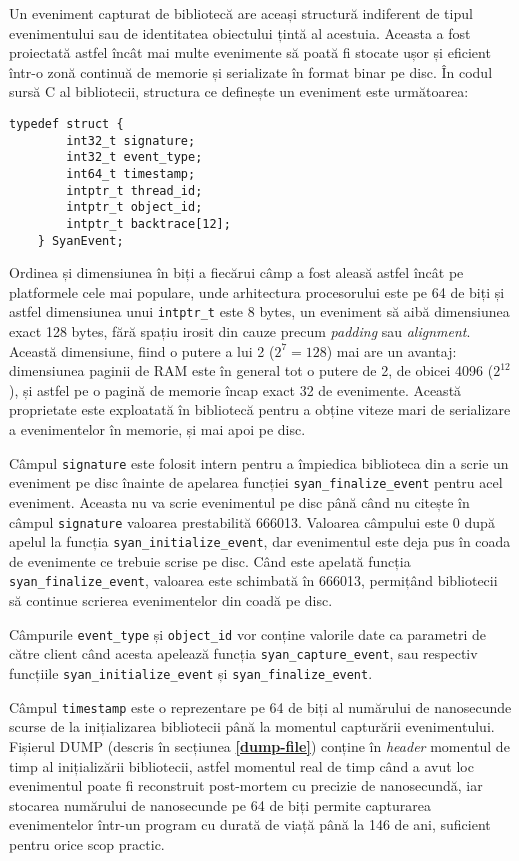 Un eveniment capturat de bibliotecă are aceași structură indiferent de
tipul evenimentului sau de identitatea obiectului țintă al acestuia.
Aceasta a fost proiectată astfel încât mai multe evenimente să poată fi
stocate ușor și eficient într-o zonă continuă de memorie și serializate
în format binar pe disc. În codul sursă C al bibliotecii, structura ce
definește un eveniment este următoarea:
\begin{lstlisting}[caption=Structura unui eveniment capturat]
    typedef struct {
        int32_t signature;
        int32_t event_type;
        int64_t timestamp;
        intptr_t thread_id;
        intptr_t object_id;
        intptr_t backtrace[12];
    } SyanEvent;
\end{lstlisting}

Ordinea și dimensiunea în biți a fiecărui câmp a fost aleasă astfel
încât pe platformele cele mai populare, unde arhitectura procesorului
este pe 64 de biți și astfel dimensiunea unui \lstinline{intptr_t} este
8 bytes, un eveniment să aibă dimensiunea exact 128 bytes, fără spațiu
irosit din cauze precum \textit{padding} sau \textit{alignment}. Această
dimensiune, fiind o putere a lui 2 ($2^7=128$) mai are un avantaj:
dimensiunea paginii de RAM este în general tot o putere de 2, de obicei
4096 ($2^{12}$), și astfel pe o pagină de memorie încap exact 32 de
evenimente. Această proprietate este exploatată în bibliotecă pentru a
obține viteze mari de serializare a evenimentelor în memorie, și mai
apoi pe disc.

Câmpul \lstinline{signature} este folosit intern pentru a împiedica
biblioteca din a scrie un eveniment pe disc înainte de apelarea funcției
\lstinline{syan_finalize_event} pentru acel eveniment. Aceasta nu va
scrie evenimentul pe disc până când nu citește în câmpul
\lstinline{signature} valoarea prestabilită 666013. Valoarea câmpului
este 0 după apelul la funcția \lstinline{syan_initialize_event}, dar
evenimentul este deja pus în coada de evenimente ce trebuie scrise pe
disc. Când este apelată funcția \lstinline{syan_finalize_event},
valoarea este schimbată în 666013, permițând bibliotecii să continue
scrierea evenimentelor din coadă pe disc.

Câmpurile \lstinline{event_type} și \lstinline{object_id} vor conține
valorile date ca parametri de către client când acesta apelează funcția
\lstinline{syan_capture_event}, sau respectiv funcțiile
\lstinline{syan_initialize_event} și \lstinline{syan_finalize_event}.

Câmpul \lstinline{timestamp} este o reprezentare pe 64 de biți al
numărului de nanosecunde scurse de la inițializarea bibliotecii până la
momentul capturării evenimentului. Fișierul DUMP (descris în secțiunea
\textbf{\ref{dump-file}}) conține în \textit{header} momentul de timp al
inițializării bibliotecii, astfel momentul real de timp când a avut loc
evenimentul poate fi reconstruit post-mortem cu precizie de nanosecundă,
iar stocarea numărului de nanosecunde pe 64 de biți permite capturarea
evenimentelor într-un program cu durată de viață până la 146 de ani,
suficient pentru orice scop practic.

